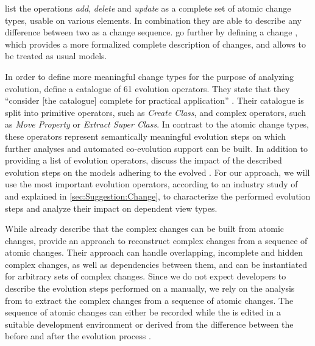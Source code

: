 \textcite{khelladi_detecting_2015} list the operations \emph{add}, \emph{delete} and \emph{update} as a complete set of atomic change types, usable on various \metamodel elements.
In combination they are able to describe any difference between two \metamodels as a change sequence.
\textcite{burger_change_2010} go further by defining a change \metamodel, which provides a more formalized complete description of \metamodel changes, and allows \metamodels to be treated as usual models.

In order to define more meaningful change types for the purpose of analyzing \metamodel evolution, \textcite{herrmannsdoerfer_extensive_2011} define a catalogue of 61 \metamodel evolution operators.
They state that they ``consider [the catalogue] complete for practical application'' \cite{herrmannsdoerfer_extensive_2011}.
Their catalogue is split into primitive operators, such as \emph{Create Class}, and complex operators, such as \emph{Move Property} or \emph{Extract Super Class}.
In contrast to the atomic change types, these operators represent semantically meaningful evolution steps on which further analyses and automated co-evolution support can be built.
In addition to providing a list of \metamodel evolution operators, \textcite{herrmannsdoerfer_extensive_2011} discuss the impact of the described evolution steps on the models adhering to the evolved \metamodels.
For our approach, we will use the most important evolution operators, according to an industry study of \textcite{khelladi_detecting_2015} and explained in \cref{sec:Suggestion:Change}, to characterize the performed evolution steps and analyze their impact on dependent view types.

While \textcite{herrmannsdoerfer_extensive_2011} already describe that the complex changes can be built from atomic changes, \textcite{khelladi_change_2018} provide an approach to reconstruct complex changes from a sequence of atomic changes.
Their approach can handle overlapping, incomplete and hidden complex changes, as well as dependencies between them, and can be instantiated for arbitrary sets of complex changes.
Since we do not expect developers to describe the evolution steps performed on a \metamodel manually, we rely on the analysis from \textcite{khelladi_change_2018} to extract the complex changes from a sequence of atomic changes.
The sequence of atomic changes can either be recorded while the \metamodel is edited in a suitable development environment or derived from the difference between the \metamodel before and after the evolution process \cite{wittler_differencing_2023}.
